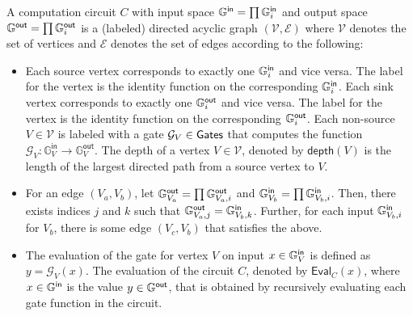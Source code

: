 \begin{definition}
A computation circuit $C$ with input space $\mathbb{G}^{\textsf{in}} = \prod \mathbb{G}^{\textsf{in}}_i$ and output space $\mathbb{G}^{\textsf{out}} = \prod \mathbb{G}^{\textsf{out}}_i$ is a (labeled) directed acyclic graph $(\mathcal{V},\mathcal{E})$ where $\mathcal{V}$ denotes the set of vertices and $\mathcal{E}$ denotes the set of edges according to the following:
\begin{itemize}

\item Each source vertex corresponds to exactly one $\mathbb{G}^{\textsf{in}}_i$ and vice versa. The label for the vertex is the identity function on the corresponding $\mathbb{G}^{\textsf{in}}_i$. Each sink vertex corresponds to exactly one $\mathbb{G}^{\textsf{out}}_i$ and vice versa. The label for the vertex is the identity function on the corresponding $\mathbb{G}^{\textsf{out}}_i$. Each non-source $V \in \mathcal{V}$ is labeled with a gate $\mathcal{G}_V \in \textnormal{\textsf{Gates}}$ that computes the function $\mathcal{G}_V: \mathbb{G}^{\textsf{in}}_V \to \mathbb{G}^{\textsf{out}}_V$. The depth of a vertex $V \in \mathcal{V}$, denoted by $\textsf{depth}(V)$ is the length of the largest directed path from a source vertex to $V$.


\item For an edge $(V_a, V_b)$, let $\mathbb{G}^{\textsf{out}}_{V_a} = \prod \mathbb{G}^{\textsf{out}}_{V_a,i}$ and $\mathbb{G}^{\textsf{in}}_{V_b} = \prod \mathbb{G}^{\textsf{in}}_{V_b, i}$. Then, there exists indices $j$ and $k$ such that $\mathbb{G}^{\textsf{out}}_{V_a,j} = \mathbb{G}^{\textsf{in}}_{V_b,k}$. Further, for each input $\mathbb{G}^{\textsf{in}}_{V_b,i}$ for $V_b$, there is some edge $(V_c, V_b)$ that satisfies the above.

\item The evaluation of the gate for vertex $V$ on input $x \in \mathbb{G}^{\textsf{in}}_V$ is defined as $y = \mathcal{G}_V(x)$. The evaluation of the circuit $C$, denoted by $\textsf{Eval}_C(x)$, where $x \in \mathbb{G}^{\textsf{in}}$ is the value $y \in \mathbb{G}^{\textsf{out}}$, that is obtained by recursively evaluating each gate function in the circuit.
\end{itemize}


\label{def:computation_circuit}
\end{definition}



